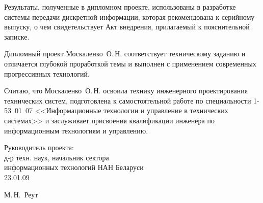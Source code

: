 \begin{singlespace}
{Результаты, полученные в дипломном проекте, использованы в разработке системы передачи дискретной информации, которая рекомендована к серийному выпуску, о чем свидетельствует Акт внедрения, прилагаемый к пояснительной записке.

Дипломный проект Москаленко~О.\,Н. соответствует техническому заданию и отличается глубокой проработкой темы и выполнен с применением современных прогрессивных технологий.

Считаю, что Москаленко~О.\,Н. освоила технику инженерного проектирования технических систем, подготовлена к самостоятельной работе по специальности 1-53~01~07
<<Информационные технологии и управление в технических системах>> и заслуживает присвоения квалификации инженера по информационным технологиям и управлению.

  \vfill
  \noindent
  \begin{minipage}{0.54\textwidth}
    \begin{flushleft}
      Руководитель проекта:\\
      д-р техн. наук, начальник сектора \\
      информационных технологий НАН Беларуси\\
      23.01.09
    \end{flushleft}
  \end{minipage}
  \begin{minipage}{0.44\textwidth}
    \begin{flushright}
      \underline{\hspace*{3cm}} М.\,Н.~Реут
    \end{flushright}
  \end{minipage}
}

\end{singlespace}

\clearpage
